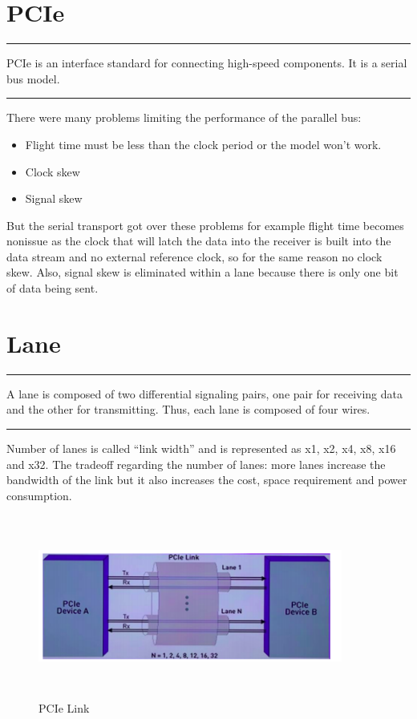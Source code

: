\section{PCIe}
\noindent\rule{13cm}{0.4pt}
\begin{defn}
PCIe is an interface standard for connecting high-speed components. It is a serial bus
model. 
\end{defn}
\noindent\rule{13cm}{0.4pt}
There were many problems limiting the performance of the parallel bus:
\begin{itemize}
    \item  Flight time must be less than the clock period or the model won’t work.
\item  Clock skew
\item  Signal skew
\end{itemize}
But the serial transport got over these problems for example flight time becomes nonissue as the clock that will latch the data into the receiver is built into the data stream
and no external reference clock, so for the same reason no clock skew. Also, signal skew
is eliminated within a lane because there is only one bit of data being sent. 

\section{Lane}

\noindent\rule{13cm}{0.4pt}
\begin{defn}
A lane is composed of two differential signaling pairs, one pair for receiving data and the other for transmitting. Thus, each lane is composed of four wires.
\end{defn}
\noindent\rule{13cm}{0.4pt}
\newline
Number of lanes is called “link width” and is represented as x1, x2, x4, x8, x16 and x32.
The tradeoff regarding the number of lanes: more lanes increase the bandwidth of the link but it also increases the cost, space requirement and power consumption.

\begin{figure}[H]
  \centering
  \includegraphics[width=100mm,height=60mm]{images/lane.png}
  \caption{PCIe Link}
\end{figure}

